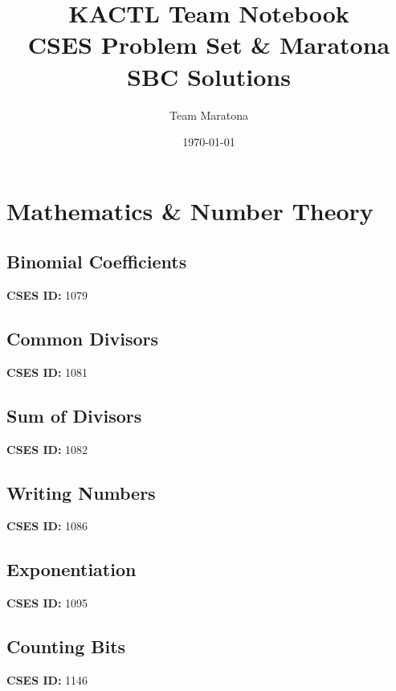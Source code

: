 \documentclass[10pt, a4paper, twocolumn, landscape]{article}
\title{\Huge \textbf{KACTL Team Notebook} \\ \large CSES Problem Set \& Maratona SBC Solutions}
\author{Team Maratona}\date{\today}
\begin{document}
\maketitle
\tableofcontents
\newpage
\section{Mathematics \& Number Theory}
\subsection{Binomial Coefficients}
\textbf{CSES ID:} 1079 \\

\vspace{0.2cm}
\subsection{Common Divisors}
\textbf{CSES ID:} 1081 \\

\vspace{0.2cm}
\subsection{Sum of Divisors}
\textbf{CSES ID:} 1082 \\

\vspace{0.2cm}
\subsection{Writing Numbers}
\textbf{CSES ID:} 1086 \\

\vspace{0.2cm}
\subsection{Exponentiation}
\textbf{CSES ID:} 1095 \\

\vspace{0.2cm}
\subsection{Counting Bits}
\textbf{CSES ID:} 1146 \\

\vspace{0.2cm}
\end{document}
